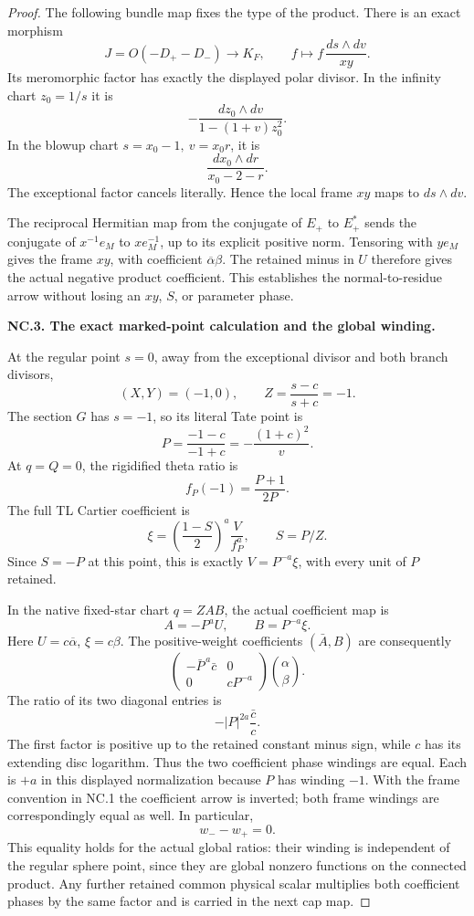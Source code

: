 \begin{proof}
The following bundle map fixes the type of the product. There is an exact morphism
\[
 J=O(-D_+-D_-)\longrightarrow K_F,\qquad
 f\longmapsto f\,\frac{ds\wedge dv}{xy}.
\]
Its meromorphic factor has exactly the displayed polar divisor. In the infinity chart \(z_0=1/s\) it is
\[
 -\frac{dz_0\wedge dv}{1-(1+v)z_0^2}.
\]
In the blowup chart \(s=x_0-1,\ v=x_0r\), it is
\[
 \frac{dx_0\wedge dr}{x_0-2-r}.
\]
The exceptional factor cancels literally. Hence the local frame \(xy\) maps to \(ds\wedge dv\).

The reciprocal Hermitian map from the conjugate of \(E_+\) to \(E_+^*\) sends the conjugate of \(x^{-1}e_M\) to \(x e_M^{-1}\), up to its explicit positive norm. Tensoring with \(y e_M\) gives the frame \(xy\), with coefficient \(\overline{\alpha}\beta\). The retained minus in \(U\) therefore gives the actual negative product coefficient. This establishes the normal-to-residue arrow without losing an \(xy\), \(S\), or parameter phase.

\par\medskip\noindent\textbf{NC.3. The exact marked-point calculation and the global winding.}\par\nopagebreak[4]

At the regular point \(s=0\), away from the exceptional divisor and both branch divisors,
\[
 (X,Y)=(-1,0),\qquad Z=\frac{s-c}{s+c}=-1.
\]
The section \(G\) has \(s=-1\), so its literal Tate point is
\[
 P=\frac{-1-c}{-1+c}=-\frac{(1+c)^2}{v}.
\]
At \(q=Q=0\), the rigidified theta ratio is
\[
 f_P(-1)=\frac{P+1}{2P}.
\]
The full TL Cartier coefficient is
\[
 \xi=\left(\frac{1-S}{2}\right)^a\frac{V}{f_P^a},
 \qquad S=P/Z.
\]
Since \(S=-P\) at this point, this is exactly \(V=P^{-a}\xi\), with every unit of \(P\) retained.

In the native fixed-star chart \(q=ZAB\), the actual coefficient map is
\[
 A=-P^aU,\qquad B=P^{-a}\xi.
\]
Here \(U=c\overline{\alpha}\), \(\xi=c\beta\). The positive-weight coefficients \((\bar A,B)\) are consequently
\[
 \begin{pmatrix}
 -\bar P^{\,a}\bar c&0\\0&cP^{-a}
 \end{pmatrix}
 \binom{\alpha}{\beta}.
\]
The ratio of its two diagonal entries is
\[
 -|P|^{2a}\frac{\bar c}{c}.
\]
The first factor is positive up to the retained constant minus sign, while \(c\) has its extending disc logarithm. Thus the two coefficient phase windings are equal. Each is \(+a\) in this displayed normalization because \(P\) has winding \(-1\). With the frame convention in NC.1 the coefficient arrow is inverted; both frame windings are correspondingly equal as well. In particular,
\[
 w_--w_+=0.
\]
This equality holds for the actual global ratios: their winding is independent of the regular sphere point, since they are global nonzero functions on the connected product. Any further retained common physical scalar multiplies both coefficient phases by the same factor and is carried in the next cap map.


\end{proof}

